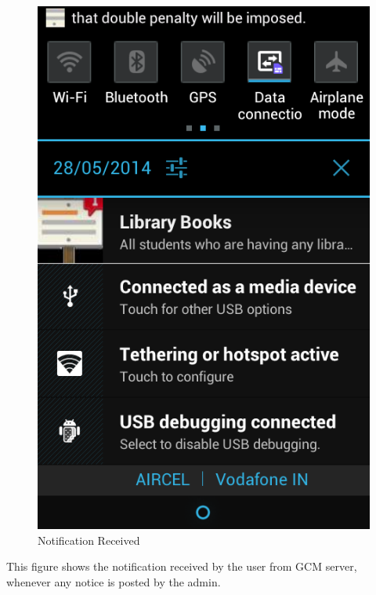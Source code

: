 \begin{figure}[H]
\centering \includegraphics[scale=0.7]{image/notify.png}
\caption{Notification Received}
\end{figure}

This figure shows the notification received by the user from GCM server, whenever any notice is posted by the admin.

